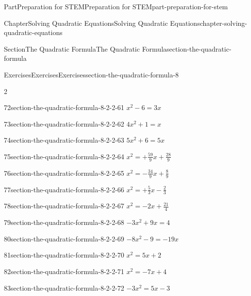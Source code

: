 \documentclass[twoside,10pt,]{book}
\numberwithin{equation}{section}
\begin{document}
\begin{partptx}{Part}{Preparation for STEM}{}{Preparation for STEM}{}{}{part-preparation-for-stem}
\begin{chapterptx}{Chapter}{Solving Quadratic Equations}{}{Solving Quadratic Equations}{}{}{chapter-solving-quadratic-equations}
\begin{sectionptx}{Section}{The Quadratic Formula}{}{The Quadratic Formula}{}{}{section-the-quadratic-formula}
\begin{exercises-subsection}{Exercises}{Exercises}{}{Exercises}{}{}{section-the-quadratic-formula-8}
\begin{exercisegroupcol}{2}
\begin{divisionexerciseegcol}{72}{}{}{section-the-quadratic-formula-8-2-2-61}%
\({x^{2}-6}={3x}\)%
\end{divisionexerciseegcol}%
\begin{divisionexerciseegcol}{73}{}{}{section-the-quadratic-formula-8-2-2-62}%
\({4x^{2}+1}={x}\)%
\end{divisionexerciseegcol}%
\begin{divisionexerciseegcol}{74}{}{}{section-the-quadratic-formula-8-2-2-63}%
\({5x^{2}+6}={5x}\)%
\end{divisionexerciseegcol}%
\begin{divisionexerciseegcol}{75}{}{}{section-the-quadratic-formula-8-2-2-64}%
\({x^{2}}={ + {\frac{59}{9}}x + {\frac{28}{9}}}\)%
\end{divisionexerciseegcol}%
\begin{divisionexerciseegcol}{76}{}{}{section-the-quadratic-formula-8-2-2-65}%
\({x^{2}}={-{\frac{34}{9}}x + {\frac{8}{9}}}\)%
\end{divisionexerciseegcol}%
\begin{divisionexerciseegcol}{77}{}{}{section-the-quadratic-formula-8-2-2-66}%
\({x^{2}}={ + {\frac{5}{3}}x-{\frac{2}{3}}}\)%
\end{divisionexerciseegcol}%
\begin{divisionexerciseegcol}{78}{}{}{section-the-quadratic-formula-8-2-2-67}%
\({x^{2}}={-2x + {\frac{21}{4}}}\)%
\end{divisionexerciseegcol}%
\begin{divisionexerciseegcol}{79}{}{}{section-the-quadratic-formula-8-2-2-68}%
\({-3x^{2}+9x}={4}\)%
\end{divisionexerciseegcol}%
\begin{divisionexerciseegcol}{80}{}{}{section-the-quadratic-formula-8-2-2-69}%
\({-8x^{2}-9}={-19x}\)%
\end{divisionexerciseegcol}%
\begin{divisionexerciseegcol}{81}{}{}{section-the-quadratic-formula-8-2-2-70}%
\({x^{2}}={5x+2}\)%
\end{divisionexerciseegcol}%
\begin{divisionexerciseegcol}{82}{}{}{section-the-quadratic-formula-8-2-2-71}%
\({x^{2}}={-7x+4}\)%
\end{divisionexerciseegcol}%
\begin{divisionexerciseegcol}{83}{}{}{section-the-quadratic-formula-8-2-2-72}%
\({-3x^{2}}={5x-3}\)%
\end{divisionexerciseegcol}%

\end{exercisegroupcol}
\end{exercises-subsection}
\end{sectionptx}
\end{chapterptx}
\end{partptx}
\end{document}
